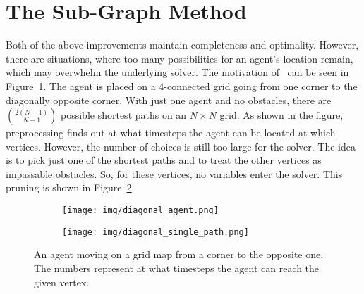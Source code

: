 \section{The Sub-Graph Method}
\label{sec:subgraph}


Both of the above improvements maintain completeness and optimality. However, there are situations, where too many possibilities for an agent's location remain, which may overwhelm the underlying solver. The motivation of~\cite{AAMAS_corridors} can be seen in Figure~\ref{fig:diagonal}. The agent is placed on a 4-connected grid going from one corner to the diagonally opposite corner. With just one agent and no obstacles, there are $\binom{2(N-1)}{N-1}$ possible shortest paths on an $N \times N$ grid. As shown in the figure, preprocessing finds out at what timesteps the agent can be located at which vertices. However, the number of choices is still too large for the solver. The idea is to pick just one of the shortest paths and to treat the other vertices as impassable obstacles. So, for these vertices, no variables enter the solver. This pruning is shown in Figure~\ref{fig:diagonal_path}.
%
\begin{figure}[ht]
\centering
\hspace{0.9cm}
\begin{subfigure}{0.27\columnwidth}
\centering
\texttt{[image: img/diagonal\_agent.png]}
\caption{}
\label{fig:diagonal}
\end{subfigure}
\hfill
\begin{subfigure}{0.27\columnwidth}
\centering
\texttt{[image: img/diagonal\_single\_path.png]}
\caption{}
\label{fig:diagonal_path}
\end{subfigure}
\hspace{0.9cm}
\caption{An agent moving on a grid map from a corner to the opposite one. The numbers represent at what timesteps the agent can reach the given vertex.}
\label{fig:diagonal_example}
\end{figure}
%
